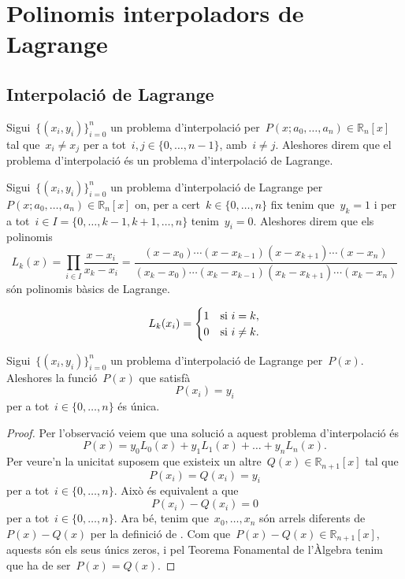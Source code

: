 \documentclass[../../Main.tex]{subfiles}
\begin{document}
\section{Polinomis interpoladors de Lagrange}
	\subsection{Interpolació de Lagrange}
	\begin{definition}
		\label{def:problema d'interpolació de Lagrange}
		Sigui~\(\{(x_{i},y_{i})\}_{i=0}^{n}\) un problema d'interpolació per~\(P(x;a_{0},\dots,a_{n})\in\mathbb{R}_{n}[x]\) tal que~\(x_{i}\neq x_{j}\) per a tot~\(i,j\in\{0,\dots,n-1\}\), amb~\(i\neq j\).
		Aleshores direm que el problema d'interpolació és un problema d'interpolació de Lagrange.
	\end{definition}
	\begin{definition}
		\label{def:problema polinomis bàsics de Lagrange}
		Sigui~\(\{(x_{i},y_{i})\}_{i=0}^{n}\) un problema d'interpolació de Lagrange per~\(P(x;a_{0},\dots,a_{n})\in\mathbb{R}_{n}[x]\) on, per a cert~\(k\in\{0,\dots,n\}\) fix tenim que~\(y_{k}=1\) i per a tot~\(i\in I=\{0,\dots,k-1,k+1,\dots,n\}\) tenim~\(y_{i}=0\).
		Aleshores direm que els polinomis
		\[
		    L_{k}(x)=\prod_{i\in I}\frac{x-x_{i}}{x_{k}-x_{i}}=\frac{(x-x_{0})\cdots(x-x_{k-1})(x-x_{k+1})\cdots(x-x_{n})}{(x_{k}-x_{0})\cdots(x_{k}-x_{k-1})(x_{k}-x_{k+1})\cdots(x_{k}-x_{n})}
		\]
		són polinomis bàsics de Lagrange.
	\end{definition}
	\begin{observation}\label{obs:polinomis bàsics de Lagrange cases}
		\[L_{k}(x_{i})=\begin{cases}
		1&\textup{si }i=k,\\
		0&\textup{si }i\neq k.
		\end{cases}\]
	\end{observation}
	\begin{proposition}\label{prop:unicitat interpolació de Lagrange}
		Sigui~\(\{(x_{i},y_{i})\}_{i=0}^{n}\) un problema d'interpolació de Lagrange per~\(P(x)\).
		Aleshores la funció~\(P(x)\) que satisfà
		\[
		    P(x_{i})=y_{i}
		\]
		per a tot~\(i\in\{0,\dots,n\}\) és única.
		\begin{proof}
			Per l'observació  veiem que una solució a aquest problema d'interpolació és
			\[
			    P(x)=y_{0}L_{0}(x)+y_{1}L_{1}(x)+\dots+y_{n}L_{n}(x).
			\]
			Per veure'n la unicitat suposem que existeix un altre~\(Q(x)\in\mathbb{R}_{n+1}[x]\) tal que
			\[
			    P(x_{i})=Q(x_{i})=y_{i}
			\]
			per a tot~\(i\in\{0,\dots,n\}\).
			Això és equivalent a que
			\[
			    P(x_{i})-Q(x_{i})=0
			\]
			per a tot~\(i\in\{0,\dots,n\}\).
			Ara bé, tenim que~\(x_{0},\dots,x_{n}\) són arrels diferents de~\(P(x)-Q(x)\) per la definició de .
			Com que~\(P(x)-Q(x)\in\mathbb{R}_{n+1}[x]\), aquests són els seus únics zeros, i pel Teorema Fonamental de l'Àlgebra tenim que ha de ser~\(P(x)=Q(x)\).
		\end{proof}
	\end{proposition}
\end{document}
